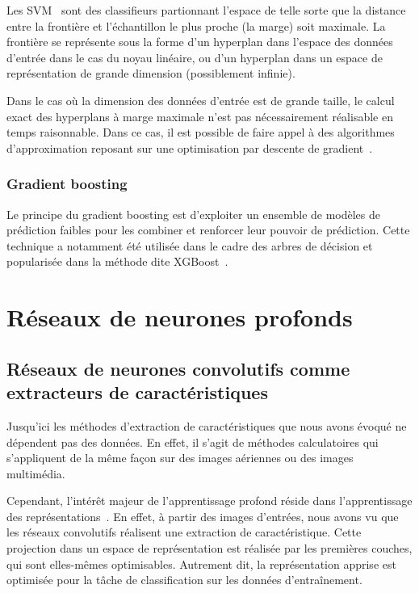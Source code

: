 Les \gls{SVM}~\cite{boser_training_1992,cortes_support-vector_1995} sont des classifieurs partionnant l'espace de telle sorte que la distance entre la frontière et l'échantillon le plus proche (la marge) soit maximale. La frontière se représente sous la forme d'un hyperplan dans l'espace des données d'entrée dans le cas du noyau linéaire, ou d'un hyperplan dans un espace de représentation de grande dimension (possiblement infinie).

Dans le cas où la dimension des données d'entrée est de grande taille, le calcul exact des hyperplans à marge maximale n'est pas nécessairement réalisable en temps raisonnable. Dans ce cas, il est possible de faire appel à des algorithmes d'approximation reposant sur une optimisation par descente de gradient~\cite{bottou_large-scale_2010}.

\subsubsection{Gradient boosting}

Le principe du gradient boosting est d'exploiter un ensemble de modèles de prédiction faibles pour les combiner et renforcer leur pouvoir de prédiction. Cette technique a notamment été utilisée dans le cadre des arbres de décision et popularisée dans la méthode dite XGBoost~\cite{friedman_greedy_2001}.

\section{Réseaux de neurones profonds}

\subsection{Réseaux de neurones convolutifs comme extracteurs de caractéristiques}

Jusqu'ici les méthodes d'extraction de caractéristiques que nous avons évoqué ne dépendent pas des données. En effet, il s'agit de méthodes calculatoires qui s'appliquent de la même façon sur des images aériennes ou des images multimédia.

Cependant, l'intérêt majeur de l'apprentissage profond réside dans l'apprentissage des représentations~\cite{bengio_representation_2013,goodfellow_deep_2016}. En effet, à partir des images d'entrées, nous avons vu que les réseaux convolutifs réalisent une extraction de caractéristique. Cette projection dans un espace de représentation est réalisée par les premières couches, qui sont elles-mêmes optimisables. Autrement dit, la représentation apprise est optimisée pour la tâche de classification sur les données d'entraînement.


